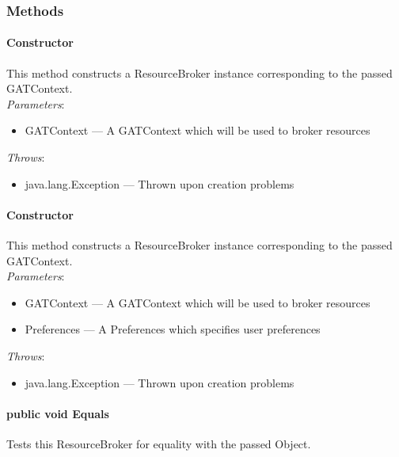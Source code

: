 \documentclass[$Date: 2003/06/26 19:29:31 $]{glabarticle}
\begin{document}
\subsubsection{Methods}

\paragraph{Constructor}

This method constructs a ResourceBroker instance corresponding to the passed GATContext. \\

\textit{Parameters}:
\begin{itemize}
\item[] GATContext --- A GATContext which will be used to broker resources
\end{itemize}

 \textit{Throws}:
 \begin{itemize}
 \item[] java.lang.Exception --- Thrown upon creation problems 
 \end{itemize}
 
\paragraph{Constructor}

This method constructs a ResourceBroker instance corresponding to the passed GATContext. \\

\textit{Parameters}:
\begin{itemize}
\item[] GATContext --- A GATContext which will be used to broker resources
\item[] Preferences --- A Preferences which specifies user preferences
\end{itemize}

 \textit{Throws}:
 \begin{itemize}
 \item[] java.lang.Exception --- Thrown upon creation problems 
 \end{itemize}

\paragraph{public void Equals}

 Tests this ResourceBroker for equality with the passed Object. \\
\end{document}
